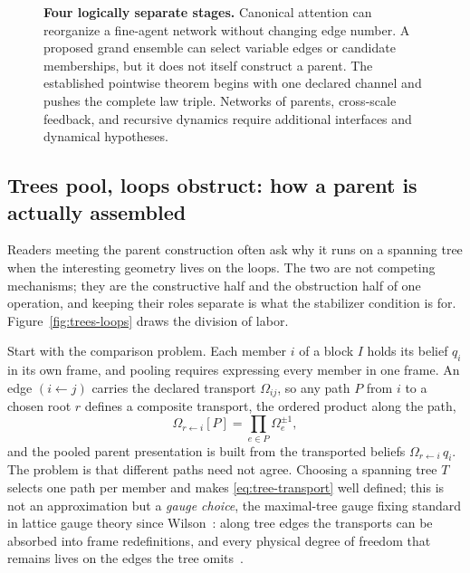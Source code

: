 \documentclass[11pt,letterpaper]{article}
\begin{document}
\begin{figure}[ht]
{}
\caption{\textbf{Four logically separate stages.} Canonical attention can reorganize a fine-agent network without changing edge number. A proposed grand ensemble can select variable edges or candidate memberships, but it does not itself construct a parent. The established pointwise theorem begins with one declared channel and pushes the complete law triple. Networks of parents, cross-scale feedback, and recursive dynamics require additional interfaces and dynamical hypotheses.}
\label{fig:thermodynamic-hierarchy}
\end{figure}

\subsection{Trees pool, loops obstruct: how a parent is actually assembled}
\label{sec:trees-loops}

Readers meeting the parent construction often ask why it runs on a spanning tree when the
interesting geometry lives on the loops. The two are not competing mechanisms; they are the
constructive half and the obstruction half of one operation, and keeping their roles separate is
what the stabilizer condition is for. Figure~\ref{fig:trees-loops} draws the division of labor.

Start with the comparison problem. Each member $i$ of a block $I$ holds its belief $q_i$ in its
own frame, and pooling requires expressing every member in one frame. An edge $(i\!\leftarrow\!j)$
carries the declared transport $\Omega_{ij}$, so any path $P$ from $i$ to a chosen root $r$
defines a composite transport, the ordered product along the path,
\begin{equation}
  \Omega_{r\leftarrow i}[P]=\prod_{e\in P}\Omega_e^{\pm 1},
  \label{eq:tree-transport}
\end{equation}
and the pooled parent presentation is built from the transported beliefs
$\Omega_{r\leftarrow i}\,q_i$. The problem is that different paths need not agree. Choosing a
spanning tree $T$ selects one path per member and makes \eqref{eq:tree-transport} well defined;
this is not an approximation but a \emph{gauge choice}, the maximal-tree gauge fixing standard in
lattice gauge theory since Wilson~\cite{Wilson1974}: along tree edges the transports can be
absorbed into frame redefinitions, and every physical degree of freedom that remains lives on the
edges the tree omits~\cite{Kogut1979}.
\end{document}
